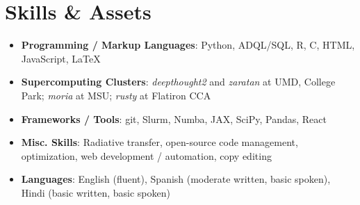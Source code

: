 \documentclass[letterpaper,10.5pt]{article}
\newcommand{\resumeSubHeadingListStart}{\begin{itemize}[leftmargin=*]}
\newcommand{\resumeSubHeadingListEnd}{\end{itemize}}
\newcommand{\shorterSection}[1]{\vspace{-10pt}\section{#1}}
\begin{document}
\shorterSection{Skills \& Assets}
  \resumeSubHeadingListStart
  \small
    \item{
     \textbf{Programming / Markup Languages}{: Python, ADQL/SQL, R, C, HTML, JavaScript, \LaTeX}
    }
    \vspace{-5pt}
    \item{
     \textbf{Supercomputing Clusters}{: \textit{deepthought2} and \textit{zaratan} at UMD, College Park; \textit{moria} at MSU; \textit{rusty} at Flatiron CCA}
    }
    \vspace{-5pt}
    \item{
     \textbf{Frameworks / Tools}{: git, Slurm, Numba, JAX, SciPy, Pandas, React}
    }
    \vspace{-5pt}
    \item{
     \textbf{Misc. Skills}{: Radiative transfer, open-source code management, optimization, web development / automation, copy editing}
    }
    \vspace{-5pt}
    \item{
     \textbf{Languages}{: English (fluent), Spanish (moderate written, basic spoken), Hindi (basic written, basic spoken)}
    }
\resumeSubHeadingListEnd
\end{document}

